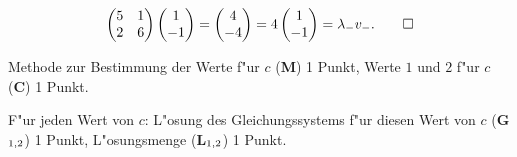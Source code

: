 \begin{loesung}
\begin{align*}
\begin{pmatrix}
5&1\\
2&6
\end{pmatrix}
\begin{pmatrix}1\\-1\end{pmatrix}
=
\begin{pmatrix}4\\-4\end{pmatrix}
=
4\begin{pmatrix}1\\-1\end{pmatrix}
=
\lambda_-v_-.
\qedhere
\end{align*}
\end{loesung}

\begin{bewertung}
\begin{teilaufgaben}
\item
Methode zur Bestimmung der Werte f"ur $c$ ({\bf M}) 1 Punkt,
Werte $1$ und $2$ f"ur $c$ ({\bf C}) 1 Punkt.
\item
F"ur jeden Wert von $c$: L"osung des Gleichungssystems f"ur diesen Wert von $c$ 
({\bf G$\mathstrut_{1,2}$}) 1 Punkt, L"osungsmenge ({\bf L$\mathstrut_{1,2}$})
1 Punkt.
\end{teilaufgaben}
\end{bewertung}

